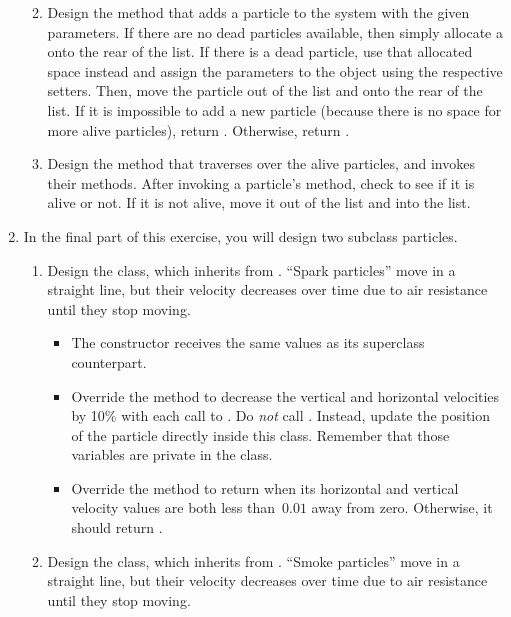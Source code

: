 \begin{enumerate}[label=(\alph*)]
\begin{enumerate}[label=(\roman*)]
\begin{itemize}
    \end{itemize}
    \item Design the  method that adds a particle to the system with the given parameters. If there are no dead particles available, then simply allocate a  onto the rear of the  list. If there is a dead particle, use that allocated space instead and assign the parameters to the object using the respective setters. Then, move the particle out of the  list and onto the rear of the  list. If it is impossible to add a new particle (because there is no space for more alive particles), return . Otherwise, return .
    \item Design the  method that traverses over the alive particles, and invokes their  methods. After invoking a particle's  method, check to see if it is alive or not. If it is not alive, move it out of the  list and into the  list. 
  \end{enumerate}
  \newpage %
  \item In the final part of this exercise, you will design two subclass particles.
  \begin{enumerate}[label=(\roman*)]
    \item Design the  class, which inherits from . ``Spark particles'' move in a straight line, but their velocity decreases over time due to air resistance until they stop moving.
    \begin{itemize}
        \item The  constructor receives the same values as its superclass counterpart.
        \item Override the  method to decrease the vertical and horizontal velocities by 10\% with each call to . Do \emph{not} call . Instead, update the position of the particle directly inside this class. Remember that those variables are private in the  class.
        \item Override the  method to return  when its horizontal and vertical velocity values are both less than~$0.01$ away from zero. Otherwise, it should return .
    \end{itemize}
    \item Design the  class, which inherits from . ``Smoke particles'' move in a straight line, but their velocity decreases over time due to air resistance until they stop moving.

\end{enumerate}
\end{enumerate}
